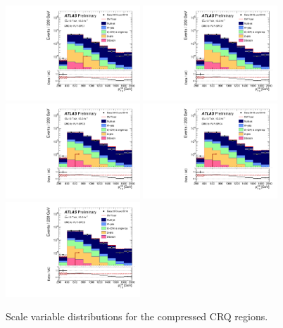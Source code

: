 \begin{figure}[tbp]
\begin{center}
\includegraphics[width=0.45\textwidth]{figures/ATLAS-CONF-2016-078_INT/N-1Plots/AtlasStyle/Preliminary/CRQ_SRJigsawSRC1_LastCut_CRQ_minusone}
\includegraphics[width=0.45\textwidth]{figures/ATLAS-CONF-2016-078_INT/N-1Plots/AtlasStyle/Preliminary/CRQ_SRJigsawSRC2_LastCut_CRQ_minusone}
\includegraphics[width=0.45\textwidth]{figures/ATLAS-CONF-2016-078_INT/N-1Plots/AtlasStyle/Preliminary/CRQ_SRJigsawSRC3_LastCut_CRQ_minusone}
\includegraphics[width=0.45\textwidth]{figures/ATLAS-CONF-2016-078_INT/N-1Plots/AtlasStyle/Preliminary/CRQ_SRJigsawSRC4_LastCut_CRQ_minusone}
\includegraphics[width=0.45\textwidth]{figures/ATLAS-CONF-2016-078_INT/N-1Plots/AtlasStyle/Preliminary/CRQ_SRJigsawSRC5_LastCut_CRQ_minusone}
\end{center}
\caption{Scale variable distributions for the compressed CRQ regions.}
\label{fig:CRQ_SRJigsawSRC1_LastCut_CRQ_minusone}
\end{figure}

